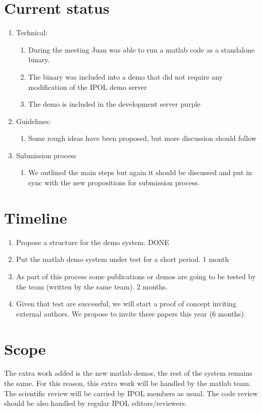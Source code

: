 \section{Current status}
\begin{enumerate}
\item Technical:
\begin{enumerate}
\item During the meeting Juan was able to run a matlab code as a standalone binary.
\item The binary was included into a demo that did not require any modification of the IPOL demo server
\item The demo is included in the development server purple
\end{enumerate}
\item Guidelines:
\begin{enumerate}
\item Some rough ideas have been proposed, but more discussion should follow
\end{enumerate}
\item Submission process
\begin{enumerate}
\item We outlined the main steps but again it should be discussed and put in sync with the new propositions for submission process.
\end{enumerate}
\end{enumerate}


\section{Timeline}
\begin{enumerate}
\item Propose a structure for the demo system. DONE
\item Put the matlab demo system under test for a short period. 1 month
\item As part of this process some publications or demos are going to be tested by the team (written by the same team). 2 months.
\item Given that test are successful, we will start a proof of concept inviting external authors. We propose to invite three papers this year (6 months).
\end{enumerate}



\section{Scope}
The extra work added is the new matlab demos, the rest of the system remains the same. For this reason, this extra work will be handled by the matlab team. The scientific review will be carried by IPOL members as usual. The code review should be also handled by regular IPOL editors/reviewers.

